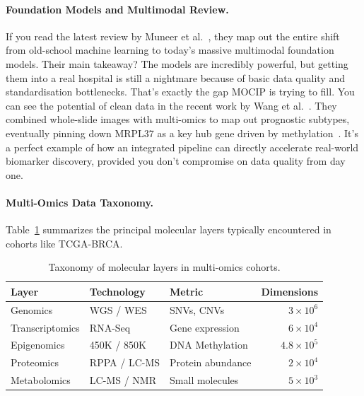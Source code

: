 \documentclass[12pt,a4paper,onecolumn]{article}
\begin{document}
\paragraph{Foundation Models and Multimodal Review.}
If you read the latest review by Muneer et al.~\cite{muneer2025review}, they map out the entire shift from old-school machine learning to today's massive multimodal foundation models. Their main takeaway? The models are incredibly powerful, but getting them into a real hospital is still a nightmare because of basic data quality and standardisation bottlenecks. That's exactly the gap MOCIP is trying to fill. You can see the potential of clean data in the recent work by Wang et al.~\cite{wang2025deeppathomic}. They combined whole-slide images with multi-omics to map out prognostic subtypes, eventually pinning down MRPL37 as a key hub gene driven by methylation~\cite{wang2025deeppathomic}. It's a perfect example of how an integrated pipeline can directly accelerate real-world biomarker discovery, provided you don't compromise on data quality from day one.

\paragraph{Multi-Omics Data Taxonomy.}
Table~\ref{tab:taxonomy} summarizes the principal molecular layers typically encountered in cohorts like TCGA-BRCA.

\begin{table}[H]
\caption{Taxonomy of molecular layers in multi-omics cohorts.}\label{tab:taxonomy}
\centering
\small
\begin{tabular}{l l l r}
\toprule
\textbf{Layer} & \textbf{Technology} & \textbf{Metric} & \textbf{Dimensions} \\
\midrule
Genomics        & WGS / WES     & SNVs, CNVs        & $3 \times 10^6$ \\
Transcriptomics & RNA-Seq       & Gene expression   & $6 \times 10^4$ \\
Epigenomics     & 450K / 850K   & DNA Methylation   & $4.8 \times 10^5$ \\
Proteomics      & RPPA / LC-MS  & Protein abundance & $2 \times 10^4$ \\
Metabolomics    & LC-MS / NMR   & Small molecules   & $5 \times 10^3$ \\
\bottomrule
\end{tabular}
\end{table}
\end{document}
